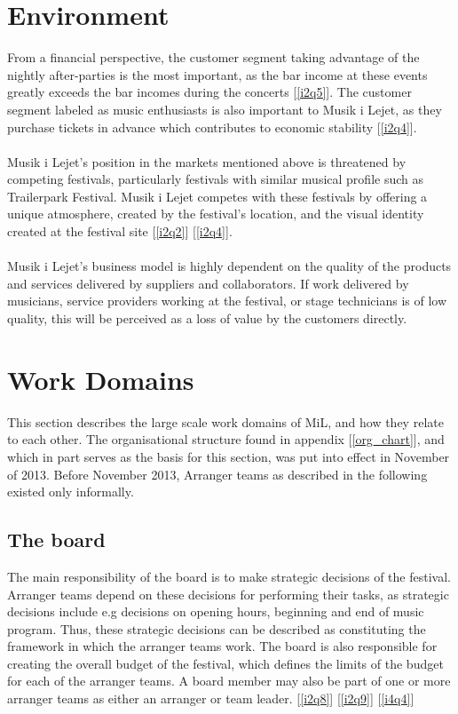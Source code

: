 \section{Environment}
From a financial perspective, the customer segment taking advantage of the nightly after-parties is the most important, as the bar income at these events greatly exceeds the bar incomes during the concerts [\ref{i2q5}]. The customer segment labeled as music enthusiasts is also important to Musik i Lejet, as they purchase tickets in advance which contributes to economic stability [\ref{i2q4}].
\\ \\
Musik i Lejet's position in the markets mentioned above is threatened by competing festivals, particularly festivals with similar musical profile such as Trailerpark Festival. Musik i Lejet competes with these festivals by offering a unique atmosphere, created by the festival's location, and the visual identity created at the festival site [\ref{i2q2}] [\ref{i2q4}].
\\ \\
Musik i Lejet's business model is highly dependent on the quality of the products and services
delivered by suppliers and collaborators. If work delivered by musicians, service providers working
at the festival, or stage technicians is of low quality, this will be perceived as a loss of value by the customers directly. 

\section{Work Domains}
\label{sec:work_domains}
This section describes the large scale work domains of MiL, and how they relate to each other. The organisational structure found in appendix [\ref{org_chart}], and which in part serves as the basis for this section, was put into effect in November of 2013. Before November 2013, Arranger teams as described in the following existed only informally.
\subsection{The board}
\label{sub:the_board}
The main responsibility of the board is to make strategic decisions of the festival. Arranger teams depend on these decisions for performing their tasks, as strategic decisions include e.g decisions on opening hours, beginning and end of music program. Thus, these strategic decisions can be described as constituting the framework in which the arranger teams work. The board is also responsible for creating the overall budget of the festival, which defines the limits of the budget for each of the arranger teams. A board member may also be part of one or more arranger teams as either an arranger or team leader. [\ref{i2q8}] [\ref{i2q9}] [\ref{i4q4}]


